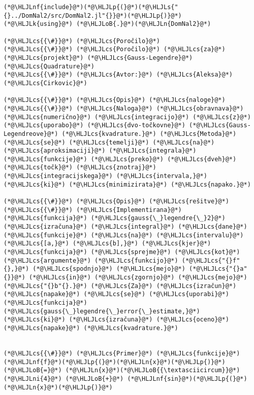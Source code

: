 \documentclass[12pt,a4paper]{article}
\newcommand{\HLJLk}[1]{\textcolor[RGB]{148,91,176}{\textbf{#1}}}
\newcommand{\HLJLn}[1]{#1}
\newcommand{\HLJLnf}[1]{\textcolor[RGB]{66,102,213}{#1}}
\newcommand{\HLJLs}[1]{\textcolor[RGB]{201,61,57}{#1}}
\newcommand{\HLJLni}[1]{\textcolor[RGB]{59,151,46}{#1}}
\newcommand{\HLJLoB}[1]{\textcolor[RGB]{102,102,102}{\textbf{#1}}}
\newcommand{\HLJLp}[1]{#1}
\newcommand{\HLJLcs}[1]{\textcolor[RGB]{153,153,119}{\textit{#1}}}
\begin{document}
\begin{lstlisting}
(*@\HLJLnf{include}@*)(*@\HLJLp{(}@*)(*@\HLJLs{"{}../DomNal2/src/DomNal2.jl"{}}@*)(*@\HLJLp{)}@*)
(*@\HLJLk{using}@*) (*@\HLJLoB{.}@*)(*@\HLJLn{DomNal2}@*)  

(*@\HLJLcs{{\#}}@*) (*@\HLJLcs{Poročilo}@*)
(*@\HLJLcs{{\#}}@*) (*@\HLJLcs{Poročilo}@*) (*@\HLJLcs{za}@*) (*@\HLJLcs{projekt}@*) (*@\HLJLcs{Gauss-Legendre}@*) (*@\HLJLcs{Quadrature}@*)
(*@\HLJLcs{{\#}}@*) (*@\HLJLcs{Avtor:}@*) (*@\HLJLcs{Aleksa}@*) (*@\HLJLcs{Cirkovic}@*)

(*@\HLJLcs{{\#}}@*) (*@\HLJLcs{Opis}@*) (*@\HLJLcs{naloge}@*)
(*@\HLJLcs{{\#}}@*) (*@\HLJLcs{Naloga}@*) (*@\HLJLcs{obravnava}@*) (*@\HLJLcs{numerično}@*) (*@\HLJLcs{integracijo}@*) (*@\HLJLcs{z}@*) (*@\HLJLcs{uporabo}@*) (*@\HLJLcs{dvo-točkovne}@*) (*@\HLJLcs{Gauss-Legendreove}@*) (*@\HLJLcs{kvadrature.}@*) (*@\HLJLcs{Metoda}@*) (*@\HLJLcs{se}@*) (*@\HLJLcs{temelji}@*) (*@\HLJLcs{na}@*) (*@\HLJLcs{aproksimaciji}@*) (*@\HLJLcs{integrala}@*) (*@\HLJLcs{funkcije}@*) (*@\HLJLcs{preko}@*) (*@\HLJLcs{dveh}@*) (*@\HLJLcs{točk}@*) (*@\HLJLcs{znotraj}@*) (*@\HLJLcs{integracijskega}@*) (*@\HLJLcs{intervala,}@*) (*@\HLJLcs{ki}@*) (*@\HLJLcs{minimizirata}@*) (*@\HLJLcs{napako.}@*)

(*@\HLJLcs{{\#}}@*) (*@\HLJLcs{Opis}@*) (*@\HLJLcs{rešitve}@*)
(*@\HLJLcs{{\#}}@*) (*@\HLJLcs{Implementirana}@*) (*@\HLJLcs{funkcija}@*) (*@\HLJLcs{gauss{\_}legendre{\_}2}@*) (*@\HLJLcs{izračuna}@*) (*@\HLJLcs{integral}@*) (*@\HLJLcs{dane}@*) (*@\HLJLcs{funkcije}@*) (*@\HLJLcs{na}@*) (*@\HLJLcs{intervalu}@*) (*@\HLJLcs{[a,}@*) (*@\HLJLcs{b],}@*) (*@\HLJLcs{kjer}@*) (*@\HLJLcs{funkcija}@*) (*@\HLJLcs{sprejme}@*) (*@\HLJLcs{kot}@*) (*@\HLJLcs{argumente}@*) (*@\HLJLcs{funkcijo}@*) (*@\HLJLcs{"{}f"{},}@*) (*@\HLJLcs{spodnjo}@*) (*@\HLJLcs{mejo}@*) (*@\HLJLcs{"{}a"{}}@*) (*@\HLJLcs{in}@*) (*@\HLJLcs{zgornjo}@*) (*@\HLJLcs{mejo}@*) (*@\HLJLcs{"{}b"{}.}@*) (*@\HLJLcs{Za}@*) (*@\HLJLcs{izračun}@*) (*@\HLJLcs{napake}@*) (*@\HLJLcs{se}@*) (*@\HLJLcs{uporabi}@*) (*@\HLJLcs{funkcija}@*) (*@\HLJLcs{gauss{\_}legendre{\_}error{\_}estimate,}@*) (*@\HLJLcs{ki}@*) (*@\HLJLcs{izračuna}@*) (*@\HLJLcs{oceno}@*) (*@\HLJLcs{napake}@*) (*@\HLJLcs{kvadrature.}@*)


(*@\HLJLcs{{\#}}@*) (*@\HLJLcs{Primer}@*) (*@\HLJLcs{funkcije}@*)
(*@\HLJLnf{f}@*)(*@\HLJLp{(}@*)(*@\HLJLn{x}@*)(*@\HLJLp{)}@*) (*@\HLJLoB{=}@*) (*@\HLJLn{x}@*)(*@\HLJLoB{{\textasciicircum}}@*)(*@\HLJLni{4}@*) (*@\HLJLoB{+}@*) (*@\HLJLnf{sin}@*)(*@\HLJLp{(}@*)(*@\HLJLn{x}@*)(*@\HLJLp{)}@*)


\end{lstlisting}
\end{document}
